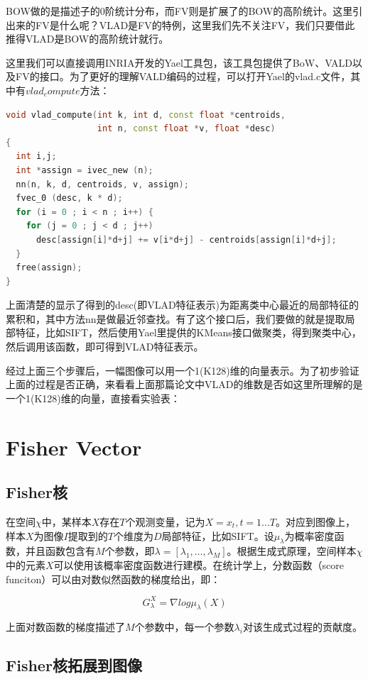 \documentclass[color=cyan,mathpazo,titlestyle=hang]{elegantbook}
\begin{document}
BOW做的是描述子的0阶统计分布，而FV则是扩展了的BOW的高阶统计。这里引出来的FV是什么呢？VLAD是FV的特例，这里我们先不关注FV，我们只要借此推得VLAD是BOW的高阶统计就行。

这里我们可以直接调用INRIA开发的Yael工具包，该工具包提供了BoW、VALD以及FV的接口。为了更好的理解VALD编码的过程，可以打开Yael的vlad.c文件，其中有$vlad_compute$方法：

\begin{lstlisting}[language=c++]
void vlad_compute(int k, int d, const float *centroids, 
                  int n, const float *v, float *desc)  
{
  int i,j;
  int *assign = ivec_new (n);
  nn(n, k, d, centroids, v, assign);
  fvec_0 (desc, k * d);
  for (i = 0 ; i < n ; i++) {
    for (j = 0 ; j < d ; j++) 
      desc[assign[i]*d+j] += v[i*d+j] - centroids[assign[i]*d+j];
  }      
  free(assign);
}
\end{lstlisting}

上面清楚的显示了得到的desc(即VLAD特征表示)为距离类中心最近的局部特征的累积和，其中方法nn是做最近邻查找。有了这个接口后，我们要做的就是提取局部特征，比如SIFT，然后使用Yael里提供的KMeans接口做聚类，得到聚类中心，然后调用该函数，即可得到VLAD特征表示。

经过上面三个步骤后，一幅图像可以用一个1(K128)维的向量表示。为了初步验证上面的过程是否正确，来看看上面那篇论文中VLAD的维数是否如这里所理解的是一个1(K128)维的向量，直接看实验表：

\section{Fisher Vector}

\subsection{Fisher核}

在空间$\chi$中，某样本$X$存在$T$个观测变量，记为$X={x_t, t=1 \dots T}$。对应到图像上，样本$X$为图像$I$提取到的$T$个维度为$D$局部特征，比如SIFT。设$\mu_\lambda$为概率密度函数，并且函数包含有$M$个参数，即$\lambda = [\lambda_1, \dots, \lambda_M]$。根据生成式原理，空间样本$\chi$中的元素$X$可以使用该概率密度函数进行建模。在统计学上，分数函数（score funciton）可以由对数似然函数的梯度给出，即：

$$G^X_\lambda = \nabla log \mu_\lambda(X)$$ 

上面对数函数的梯度描述了$M$个参数中，每一个参数$\lambda_i$对该生成式过程的贡献度。

\subsection{Fisher核拓展到图像}
\end{document}
